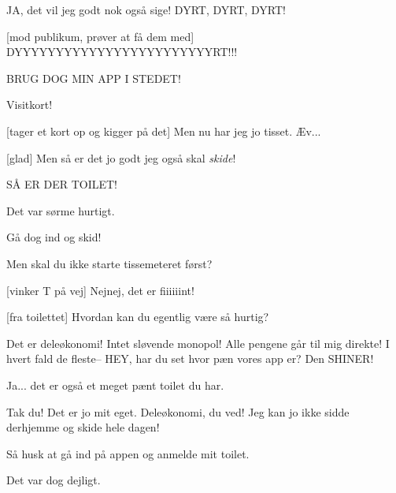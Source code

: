 \documentclass[a4paper,11pt]{article}
\begin{document}
\begin{sketch}
 JA, det vil jeg godt nok også sige!  DYRT, DYRT, DYRT!


[mod publikum, prøver at få dem med]
DYYYYYYYYYYYYYYYYYYYYYYYYRT!!!

 BRUG DOG MIN APP I STEDET!

 Visitkort!


[tager et kort op og kigger på det] Men nu har jeg jo tisset.  Æv...


[glad] Men så er det jo godt jeg også skal \emph{skide}!



 SÅ ER DER TOILET!

 Det var sørme hurtigt.


 Gå dog ind og skid!

 Men skal du ikke starte tissemeteret først?

[vinker T på vej] Nejnej, det er fiiiiiint!


[fra toilettet] Hvordan kan du egentlig være så hurtig?

 Det er deleøkonomi!  Intet sløvende monopol!  Alle pengene går til mig direkte!  I hvert fald de fleste--  HEY, har du set hvor pæn vores app er?  Den SHINER!

 Ja... det er også et meget pænt toilet du har.

 Tak du!  Det er jo mit eget.  Deleøkonomi, du ved!  Jeg kan jo ikke sidde derhjemme og skide hele dagen!

 Så husk at gå ind på appen og anmelde mit toilet.


 Det var dog dejligt.


\end{sketch}
\end{document}
